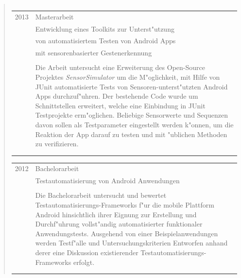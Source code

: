 \begin{quote}
\begin{tabular}{p{4cm}l}
	\end{tabular}
%
	\begin{tabular}{p{4cm}l}
		2013&Masterarbeit\\
		&\qquad Entwicklung eines Toolkits zur Unterst"utzung\\
		&\qquad von automatisiertem Testen von Android Apps\\
		&\qquad mit sensorenbasierter Gestenerkennung\\\\
		&\begin{minipage}{10cm}
		Die Arbeit untersucht eine Erweiterung des Open-Source Projektes \emph{SensorSimulator} um die M"oglichkeit, mit Hilfe von JUnit automatisierte Tests von Sensoren-unterst"utzten Android Apps durchzuf"uhren. Der bestehende Code wurde um Schnittstellen erweitert, welche eine Einbindung in JUnit Testprojekte erm"oglichen. Beliebige Sensorwerte und Sequenzen davon sollen als Testparameter eingestellt werden k"onnen, um die Reaktion der App darauf zu testen und mit "ublichen Methoden zu verifizieren.
		\end{minipage}\\\\\\
	\end{tabular}
%
	\begin{tabular}{p{4cm}l}
		2012&Bachelorarbeit\\
		&\qquad Testautomatisierung von Android Anwendungen\\\\
		&\begin{minipage}{10cm}
Die Bachelorarbeit untersucht und bewertet Testautomatisierungs-Frameworks f"ur die mobile Plattform Android hinsichtlich ihrer Eignung zur Erstellung und Durchf"uhrung vollst"andig automatisierter funktionaler Anwendungstests. Ausgehend von einer Beispielanwendungen werden Testf"alle und Untersuchungskriterien Entworfen anhand derer eine Diskussion existierender Testautomatisierungs-Frameworks erfolgt.
		\end{minipage}\\\\\\
	\end{tabular}
%
%
\end{quote}
\fi
\ifshowLehreEssen
